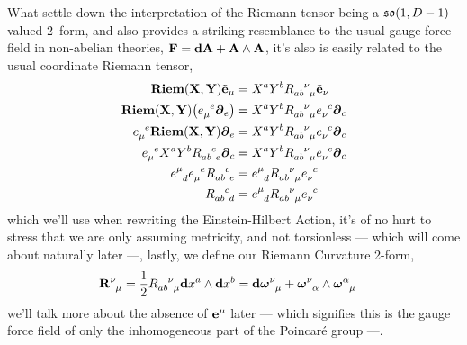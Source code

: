 What settle down the interpretation of the Riemann tensor being a $\mathfrak{so}\qty(1,D-1)$--valued 2--form, and also provides a striking resemblance to the usual gauge force field in non-abelian 
theories, $\vb F=\vb d\vb A+\vb A\wedge \vb A$, it's also is easily related to the usual coordinate Riemann tensor,
\begin{align*}
    \textbf{Riem}\qty(\vb X,\vb Y)\tilde{\vb e}_\mu&=X^aY^b\tensor{R}{_a_b^\nu_\mu}\tilde{\vb e}_\nu\\
    \textbf{Riem}\qty(\vb X,\vb Y)\qty(\tensor{e}{_\mu^e}\boldsymbol\partial_e)&=X^aY^b\tensor{R}{_a_b^\nu_\mu}\tensor{e}{_\nu^c}\boldsymbol\partial_c\\
    \tensor{e}{_\mu^e}\textbf{Riem}\qty(\vb X,\vb Y)\boldsymbol\partial_e&=X^aY^b\tensor{R}{_a_b^\nu_\mu}\tensor{e}{_\nu^c}\boldsymbol\partial_c\\
    \tensor{e}{_\mu^e}X^aY^b\tensor{R}{_a_b^c_e}\boldsymbol\partial_c&=X^aY^b\tensor{R}{_a_b^\nu_\mu}\tensor{e}{_\nu^c}\boldsymbol\partial_c\\
    \tensor{e}{^\mu_d}\tensor{e}{_\mu^e}\tensor{R}{_a_b^c_e}&=\tensor{e}{^\mu_d}\tensor{R}{_a_b^\nu_\mu}\tensor{e}{_\nu^c}\\
    \tensor{R}{_a_b^c_d}&=\tensor{e}{^\mu_d}\tensor{R}{_a_b^\nu_\mu}\tensor{e}{_\nu^c}
\end{align*}
which we'll use when rewriting the Einstein-Hilbert Action, it's of no hurt to stress that we are only assuming metricity, and not torsionless --- which will come about naturally later ---, 
lastly, we define our Riemann Curvature 2-form,
\begin{align*}
    \tensor{{\vb R}}{^\nu_\mu}&=\frac12\tensor{R}{_a_b^\nu_\mu}\vb d{x^a}\wedge\vb d{x^b}=\tensor{\vb d{\boldsymbol\omega}}{^\nu_\mu}+\tensor{{\boldsymbol\omega}}{^\nu_\alpha}\wedge\tensor{{\boldsymbol\omega}}{^\alpha_\mu}%
\end{align*}
we'll talk more about the absence of $\vb e^\mu$ later --- which signifies this is the gauge force field of only the inhomogeneous part of the Poincaré group ---.

